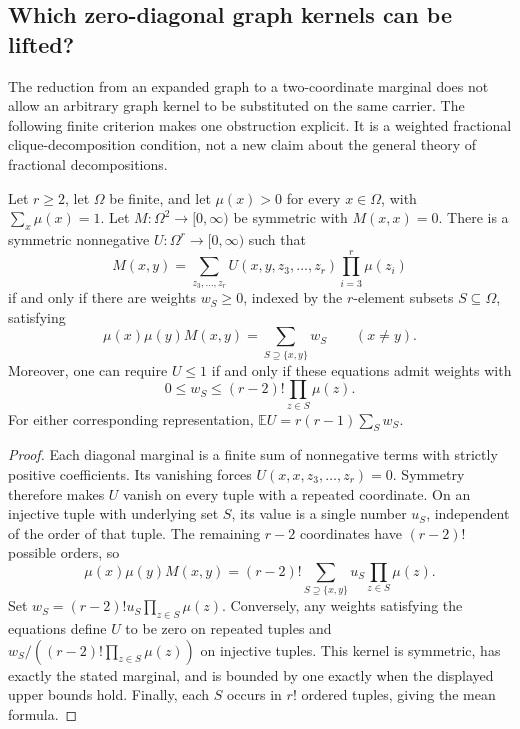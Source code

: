 \subsection{Which zero-diagonal graph kernels can be lifted?}

The reduction from an expanded graph to a two-coordinate marginal does not
allow an arbitrary graph kernel to be substituted on the same carrier.
The following finite criterion makes one obstruction explicit.  It is a
weighted fractional clique-decomposition condition, not a new claim about
the general theory of fractional decompositions.

\begin{proposition}
Let $r\ge2$, let $\Omega$ be finite, and let $\mu(x)>0$ for every
$x\in\Omega$, with $\sum_x\mu(x)=1$.  Let $M:\Omega^2\to[0,\infty)$ be
symmetric with $M(x,x)=0$.  There is a symmetric nonnegative
$U:\Omega^r\to[0,\infty)$ such that
\[
 M(x,y)=\sum_{z_3,\ldots,z_r}
 U(x,y,z_3,\ldots,z_r)\prod_{i=3}^r\mu(z_i)
\]
if and only if there are weights $w_S\ge0$, indexed by the $r$-element
subsets $S\subseteq\Omega$, satisfying
\[
 \mu(x)\mu(y)M(x,y)=\sum_{S\supseteq\{x,y\}}w_S\qquad(x\ne y).
\]
Moreover, one can require $U\le1$ if and only if these equations admit
weights with
\[
 0\le w_S\le(r-2)!\prod_{z\in S}\mu(z).
\]
For either corresponding representation,
$\mathbb E U=r(r-1)\sum_Sw_S$.
\end{proposition}
\begin{proof}
Each diagonal marginal is a finite sum of nonnegative terms with strictly
positive coefficients.  Its vanishing forces $U(x,x,z_3,\ldots,z_r)=0$.
Symmetry therefore makes $U$ vanish on every tuple with a repeated
coordinate.  On an injective tuple with underlying set $S$, its value is
a single number $u_S$, independent of the order of that tuple.  The
remaining $r-2$ coordinates have $(r-2)!$ possible orders, so
\[
 \mu(x)\mu(y)M(x,y)
 =(r-2)!\sum_{S\supseteq\{x,y\}}u_S\prod_{z\in S}\mu(z).
\]
Set $w_S=(r-2)!u_S\prod_{z\in S}\mu(z)$.  Conversely, any weights
satisfying the equations define $U$ to be zero on repeated tuples and
$w_S/((r-2)!\prod_{z\in S}\mu(z))$ on injective tuples.  This kernel is
symmetric, has exactly the stated marginal, and is bounded by one exactly
when the displayed upper bounds hold.  Finally, each $S$ occurs in $r!$
ordered tuples, giving the mean formula.
\end{proof}

